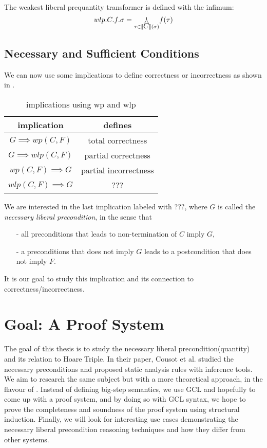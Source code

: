 \documentclass[adraft,hidelinks]{eptcs}
\begin{document}
The weakest liberal prequantity transformer is defined with the infimum: 
\[wlp.C.f.\sigma = \underset{\tau\in\bkt C(\sigma)}{\bigjoin} f(\tau)\]

\subsection{Necessary and Sufficient Conditions}
We can now use some implications to define correctness or incorrectness as shown in . 
\begin{table}\centering 
    \begin{tabular}{cc}
      \textbf{implication}&\textbf{defines}    \\ \hline
      $G\implies wp(C,F)$&   total correctness   \\
      $G\implies wlp(C,F)$&  partial correctness\\
      $wp(C,F)\implies G$&  partial incorrectness\\
      $wlp(C,F)\implies G$&  ???\\
    \end{tabular}
    \caption{implications using wp and wlp\cite{Zhang2022}}
    \label{tab:impl}
\end{table}    

We are interested in the last implication labeled with ???, where $G$ is called the \textit{necessary liberal precondition}, in the sense that 
\begin{itemize}
    \item [-] all preconditions that leads to non-termination of $C$ imply $G$, 
    \item [-] a preconditions that does not imply $G$ leads to a postcondition that does not imply $F$. 
\end{itemize}
It is our goal to study this implication and its connection to correctness/incorrectness. 


\section{Goal: A Proof System}
The goal of this thesis is to study the necessary liberal precondition(quantity) and its relation to Hoare Triple. 
In their paper, Cousot et al. studied the necessary preconditions and proposed static analysis rules with inference tools. 
We aim to research the same subject but with a more theoretical approach, in the flavour of \cite{Vries2011}. 
Instead of defining big-step semantics, we use GCL and hopefully to come up with a proof system, 
and by doing so with GCL syntax, we hope to prove the completeness and soundness of the proof system using structural induction. 
Finally, we will look for interesting use cases demonstrating the necessary liberal precondition reasoning techniques and how they differ from other systems. 







\end{document}
